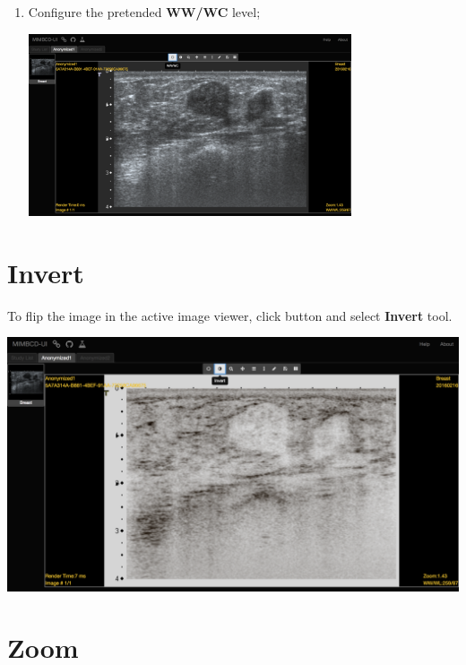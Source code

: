 \documentclass{tufte-book} %
\begin{document}
\begin{enumerate}
\hfill

\item Configure the pretended \textbf{WW/WC} level;

\hfill

\begin{center}
\includegraphics[width=0.75\textwidth]{graphics/anon1_ww_on.png}
\end{center}

\hfill

\end{enumerate}

\chapter{Invert}

To flip the image in the active image viewer, click button and select \textbf{Invert} tool.

\hfill

\begin{center}
\includegraphics[width=\textwidth]{graphics/anon1_invert.png}
\end{center}

\hfill

\chapter{Zoom}
\end{document}
